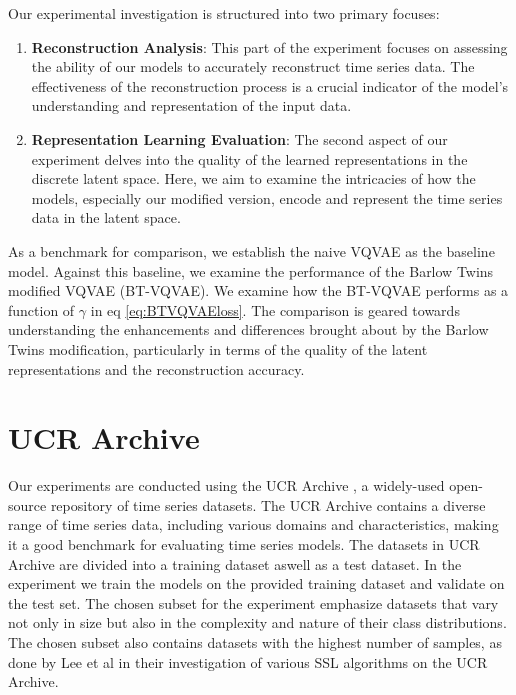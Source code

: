 Our experimental investigation is structured into two primary focuses:

\begin{enumerate}
    \item \textbf{Reconstruction Analysis}: This part of the experiment focuses on assessing the ability of our models to accurately reconstruct time series data. The effectiveness of the reconstruction process is a crucial indicator of the model's understanding and representation of the input data. 
    \item \textbf{Representation Learning Evaluation}: The second aspect of our experiment delves into the quality of the learned representations in the discrete latent space. Here, we aim to examine the intricacies of how the models, especially our modified version, encode and represent the time series data in the latent space. 
\end{enumerate}
As a benchmark for comparison, we establish the naive VQVAE as the baseline model. Against this baseline, we examine the performance of the Barlow Twins modified VQVAE (BT-VQVAE). 
We examine how the BT-VQVAE performs as a function of $\gamma$ in eq \ref{eq:BTVQVAEloss}.  
The comparison is geared towards understanding the enhancements and differences brought about by the Barlow Twins modification, particularly in terms of the quality of the latent representations and the reconstruction accuracy.

\section{UCR Archive}
Our experiments are conducted using the UCR Archive \cite{UCRArchive2018}, a widely-used open-source repository of time series datasets. The UCR Archive contains a diverse range of time series data, including various domains and characteristics, making it a good benchmark for evaluating time series models.
The datasets in UCR Archive are divided into a training dataset aswell as a test dataset. In the experiment we train the models on the provided training dataset and validate on the test set.
The chosen subset for the experiment emphasize datasets that vary not only in size but also in the complexity and nature of their class distributions. The chosen subset also contains datasets with the highest number of samples, as done by Lee et al in their investigation of various SSL algorithms on the UCR Archive\cite{SSLs}.

